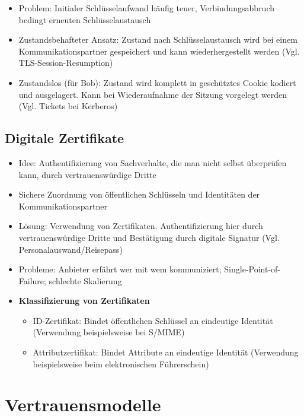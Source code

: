 \begin{itemize}
\begin{itemize}
		\begin{itemize}
			\item Problem: Initialer Schlüsselaufwand häufig teuer, Verbindungsabbruch bedingt erneuten Schlüsselaustausch
			\item Zustandsbehafteter Ansatz: Zustand nach Schlüsselaustausch wird bei einem Kommunikationspartner gespeichert und kann wiederhergestellt werden (Vgl. TLS-Session-Resumption)
			\item Zustandslos (für Bob): Zustand wird komplett in geschütztes Cookie kodiert und ausgelagert. Kann bei Wiederaufnahme der Sitzung vorgelegt werden (Vgl. Tickets bei Kerberos)
		\end{itemize}
	\end{itemize}
\end{itemize}


\subsection{Digitale Zertifikate}
\begin{itemize}
	\item Idee: Authentifizierung von Sachverhalte, die man nicht selbst überprüfen kann, durch vertrauenswürdige Dritte
	\item Sichere Zuordnung von öffentlichen Schlüsseln und Identitäten der Kommunikationspartner
	\item Lösung: Verwendung von Zertifikaten. Authentifizierung hier durch vertrauenswürdige Dritte und Bestätigung durch digitale Signatur (Vgl. Personalauswand/Reisepass)
	\item Probleme: Anbieter erfährt wer mit wem kommuniziert; Single-Point-of-Failure; schlechte Skalierung
	\item \textbf{Klassifizierung von Zertifikaten}
	\begin{itemize}
		\item ID-Zertifikat: Bindet öffentlichen Schlüssel an eindeutige Identität (Verwendung beispielsweise bei S/MIME)
		\item Attributzertifikat: Bindet Attribute an eindeutige Identität (Verwendung beispielsweise beim elektronischen Führerschein)
	\end{itemize}
\end{itemize}



\section{Vertrauensmodelle}

